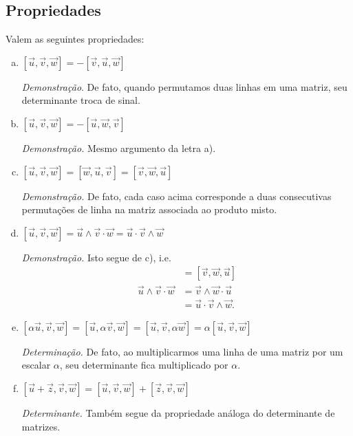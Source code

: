 \subsection{Propriedades}

Valem as seguintes propriedades:
\begin{enumerate}[a)]
\item {\color{blue}$[\vec{u},\vec{v},\vec{w}] = -[\vec{v},\vec{u},\vec{w}]$}

  {\it Demonstração}. De fato, quando permutamos duas linhas em uma matriz, seu determinante troca de sinal.
  
\item {\color{blue}$[\vec{u},\vec{v},\vec{w}] = -[\vec{u},\vec{w},\vec{v}]$}

  {\it Demonstração.} Mesmo argumento da letra a).
  
\item {\color{blue}$[\vec{u},\vec{v},\vec{w}] = [\vec{w},\vec{u},\vec{v}] = [\vec{v},\vec{w},\vec{u}]$}

  {\it Demonstração.} De fato, cada caso acima corresponde a duas consecutivas permutações de linha na matriz associada ao produto misto.
  
\item {\color{blue}$[\vec{u},\vec{v},\vec{w}] = \vec{u}\land\vec{v}\cdot\vec{w} = \vec{u}\cdot\vec{v}\land\vec{w}$}

  {\it Demonstração.} Isto segue de c), i.e.
  \begin{align}
    [\vec{u},\vec{v},\vec{w}] &= [\vec{v},\vec{w},\vec{u}] \\
    \vec{u}\land\vec{v}\cdot\vec{w} &= \vec{v}\land\vec{w}\cdot\vec{u}\\
                              &= \vec{u}\cdot\vec{v}\land\vec{w}.
  \end{align}
  
\item {\color{blue}$[\alpha\vec{u},\vec{v},\vec{w}] = [\vec{u},\alpha\vec{v},\vec{w}]=[\vec{u},\vec{v},\alpha\vec{w}] = \alpha[\vec{u},\vec{v},\vec{w}]$}

  {\it Determinação.} De fato, ao multiplicarmos uma linha de uma matriz por um escalar $\alpha$, seu determinante fica multiplicado por $\alpha$.
  
\item {\color{blue}$[\vec{u}+\vec{z},\vec{v},\vec{w}] = [\vec{u},\vec{v},\vec{w}]+[\vec{z},\vec{v},\vec{w}]$}

  {\it Determinante.} Também segue da propriedade análoga do determinante de matrizes.
\end{enumerate}

